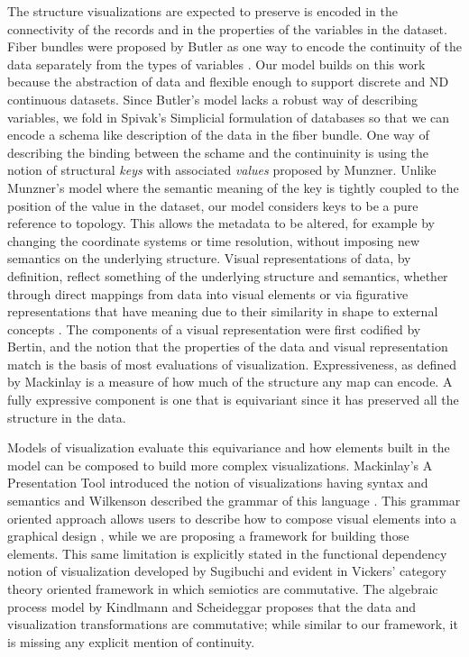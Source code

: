 \documentclass[journal]{vgtc}                %
\begin{document}
The structure visualizations are expected to preserve is encoded in the connectivity of the records and in the properties of the variables in the dataset. Fiber bundles were proposed by Butler as one way to encode the continuity of the data separately from the types of variables \cite{butlerVisualizationModelBased1989,butlerVectorBundleClassesForm1992}. Our model builds on this work because the abstraction of data and flexible enough to support discrete and ND continuous datasets. Since Butler's model lacks a robust way of describing variables, we fold in Spivak's Simplicial formulation of databases \cite{spivakDatabasesAreCategories2010,spivakSIMPLICIALDATABASES} so that we can encode a schema like description of the data in the fiber bundle. One way of describing the binding between the schame and the continuinity is using the notion of structural \textit{keys} with associated \textit{values} proposed by Munzner\cite{munznerVisualizationAnalysisDesign2014}. Unlike Munzner's model where the semantic meaning of the key is tightly coupled to the position of the value in the dataset, our model considers keys to be a pure reference to topology. This allows the metadata to be altered, for example by changing the coordinate systems or time resolution, without imposing new semantics on the underlying structure. 
Visual representations of data, by definition, reflect something of the underlying structure and semantics\cite{friendlyBriefHistoryData2008}, whether through direct mappings from data into visual elements or via figurative representations that have meaning due to their similarity in shape to external concepts \cite{byrneAcquiredCodesMeaning2016}. The components of a visual representation were first codified by Bertin\cite{bertinSemiologyGraphicsDiagrams2011a}, and the notion that the properties of the data and visual representation match is the basis of most evaluations of visualization. Expressiveness, as defined by Mackinlay \cite{mackinlayAUTOMATICDESIGNGRAPHICAL1987, mackinlayAutomatingDesignGraphical1986} is a measure of how much of the structure any map can encode. A fully expressive component is one that is equivariant since it has preserved all the structure in the data. 

Models of visualization evaluate this equivariance and how elements built in the model can be composed to build more complex visualizations. Mackinlay's A Presentation Tool introduced the notion of visualizations having syntax and semantics \cite{mackinlayAutomatingDesignGraphical1986} and Wilkenson described the grammar of this language \cite{wilkinsonGrammarGraphics2005}. This grammar oriented approach allows users to describe how to compose visual elements into a graphical design \cite{wongsuphasawatNavigatingWideWorld2021}, while we are proposing a framework for building those elements. This same limitation is explicitly stated in the functional dependency notion of visualization developed by Sugibuchi\cite{sugibuchiFramwork2009} and evident in Vickers' category theory oriented framework in which semiotics are commutative. The algebraic process model by Kindlmann and Scheideggar proposes that the data and visualization transformations are commutative; while similar to our framework, it is missing any explicit mention of continuity. 
\end{document}
